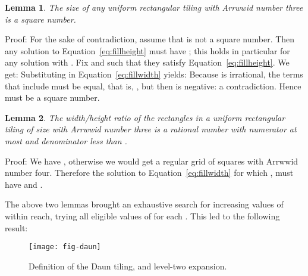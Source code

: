 \documentclass[11pt,a4paper]{article}
\newtheorem{lemma}{Lemma}
\newenvironment{proof}{Proof:}{\qed}
\def\squareforqed{\hbox{\rlap{}}}
\def\qed{\ifmmode\squareforqed\else{\unskip\nobreak\hfil
\penalty50\hskip1em\null\nobreak\hfil\squareforqed
\parfillskip=0pt\finalhyphendemerits=0\endgraf}\fi}
\begin{document}
\begin{lemma}
The size  of any uniform rectangular tiling with Arrwwid number three is a square number.
\end{lemma}
\begin{proof}
For the sake of contradiction, assume that  is not a square number. Then any solution to Equation~\ref{eq:fillheight} must have ; this holds in particular for any solution with . Fix  and  such that they satisfy Equation~\ref{eq:fillheight}. We get:
Substituting  in Equation~\ref{eq:fillwidth} yields:
Because  is irrational, the terms that include  must be equal, that is, , but then  is negative: a contradiction. Hence  must be a square number.
\end{proof}

\begin{lemma}
The width/height ratio  of the rectangles in a uniform rectangular tiling of size  with Arrwwid number three is a rational number with numerator at most  and denominator less than .
\end{lemma}
\begin{proof}
We have , otherwise we would get a regular grid of squares with Arrwwid number four. Therefore the solution to Equation~\ref{eq:fillwidth} for which , must have  and . \end{proof}

The above two lemmas brought an exhaustive search for increasing values of  within reach, trying all eligible values of  for each . This led to the following result:

\begin{figure}
\centering
\texttt{[image: fig-daun]}
\caption{Definition of the Daun tiling, and level-two expansion.}
\label{fig:daun}
\end{figure}
\end{document}
